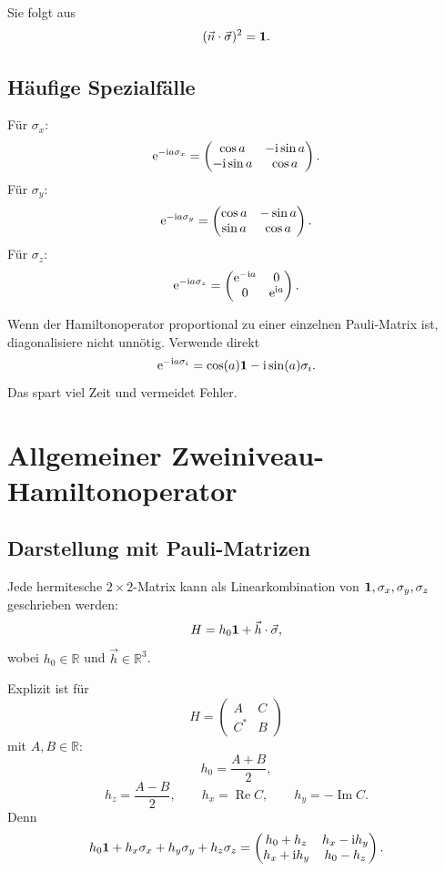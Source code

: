 Sie folgt aus
\[
    (\vec n\cdot\vec\sigma)^2=\mathbf{1}.
\]

\subsection{Häufige Spezialfälle}

Für \(\sigma_x\):
\[
    \mathrm{e}^{-\mathrm{i} a\sigma_x}
    =
    \begin{pmatrix}
        \cos a&-\mathrm{i}\sin a\\
        -\mathrm{i}\sin a&\cos a
    \end{pmatrix}.
\]
Für \(\sigma_y\):
\[
    \mathrm{e}^{-\mathrm{i} a\sigma_y}
    =
    \begin{pmatrix}
        \cos a&-\sin a\\
        \sin a&\cos a
    \end{pmatrix}.
\]
Für \(\sigma_z\):
\[
    \mathrm{e}^{-\mathrm{i} a\sigma_z}
    =
    \begin{pmatrix}
        \mathrm{e}^{-\mathrm{i} a}&0\\
        0&\mathrm{e}^{\mathrm{i} a}
    \end{pmatrix}.
\]

\begin{examtipbox}
Wenn der Hamiltonoperator proportional zu einer einzelnen Pauli-Matrix ist, diagonalisiere nicht unnötig. Verwende direkt
\[
    \mathrm{e}^{-\mathrm{i} a\sigma_i}=\cos(a)\mathbf{1}-\mathrm{i}\sin(a)\sigma_i.
\]
Das spart viel Zeit und vermeidet Fehler.
\end{examtipbox}

\section{Allgemeiner Zweiniveau-Hamiltonoperator}

\subsection{Darstellung mit Pauli-Matrizen}

Jede hermitesche \(2\times2\)-Matrix kann als Linearkombination von \(\mathbf{1},\sigma_x,\sigma_y,\sigma_z\) geschrieben werden:
\[
    H=h_0\mathbf{1}+\vec h\cdot\vec\sigma,
\]
wobei \(h_0\in\mathbb R\) und \(\vec h\in\mathbb R^3\).

Explizit ist für
\[
    H=
    \begin{pmatrix}
        A&C\\C^*&B
    \end{pmatrix}
\]
mit \(A,B\in\mathbb R\):
\[
    h_0=\frac{A+B}{2},
\]
\[
    h_z=\frac{A-B}{2},
    \qquad
    h_x=\operatorname{Re}C,
    \qquad
    h_y=-\operatorname{Im}C.
\]
Denn
\[
    h_0\mathbf{1}+h_x\sigma_x+h_y\sigma_y+h_z\sigma_z
    =
    \begin{pmatrix}
        h_0+h_z&h_x-\mathrm{i} h_y\\
        h_x+\mathrm{i} h_y&h_0-h_z
    \end{pmatrix}.
\]

